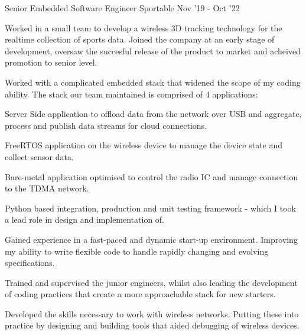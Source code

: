 \begin{cventries}
  \cventry
    {Senior Embedded Software Engineer}
    {Sportable}
    {}
    {Nov '19 - Oct '22}
    {
      Worked in a small team to develop a wireless 3D tracking technology for the realtime collection of sports data. Joined the company 
      at an early stage of development, oversaw the succesful release of the product to market and acheived promotion to senior level.
      \begin{cvitems}
        \item{Worked with a complicated embedded stack that widened the scope of my coding ability. The stack our team maintained is comprised of 4 applications:}
        \begin{cvitems}
          \item{Server Side application to offload data from the network over USB and aggregate, process and publish data streams for cloud connections.}
          \item{FreeRTOS application on the wireless device to manage the device state and collect sensor data.}
          \item{Bare-metal application optimised to control the radio IC and manage connection to the TDMA network.}
          \item{Python based integration, production and unit testing framework - which I took a lead role in design and implementation of.}
        \end{cvitems}
        \item{Gained experience in a fast-paced and dynamic start-up environment. Improving my ability to write flexible code to handle rapidly changing and evolving specifications.}
        \item{Trained and supervised the junior engineers, whilst also leading the development of coding practices that create a more approachable stack for new starters.}
        \item{Developed the skills necessary to work with wireless networks. Putting these into practice by designing and building tools that aided debugging of wireless devices.}
      \end{cvitems}  
    }


\end{cventries}
